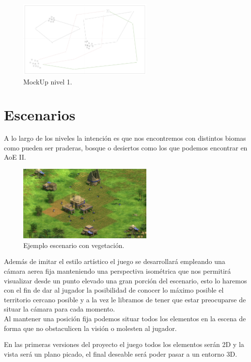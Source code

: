 \begin{figure}[ht]
\centering
\includegraphics[width=0.6\textwidth]{imagenes/gdd/nivel1.png}
\caption{MockUp nivel 1.}
\label{esq:lvl1}
\end{figure}

\section{Escenarios}
A lo largo de los niveles la intención es que nos encontremos con distintos biomas como
pueden ser praderas, bosque o desiertos como los que podemos encontrar en \ac{AoE} II.

\begin{figure}[ht]
\centering
\includegraphics[width=0.6\textwidth]{imagenes/gdd/mapa_aoe_1.jpg}
\caption{Ejemplo escenario con vegetación.}
\label{img:mapa_aoe1}
\end{figure}

Además de imitar el estilo artístico el juego se desarrollará empleando una cámara
aerea fija manteniendo una perspectiva isométrica que nos permitirá visualizar desde
un punto elevado una gran porción del escenario, esto lo haremos con el fin de dar al
jugador la posibilidad de conocer lo máximo posible el territorio cercano posible y a la
vez le libramos de tener que estar preocuparse de situar la cámara para cada momento. \\
Al mantener una posición fija podemos situar todos los elementos en la escena de forma
que no obstaculicen la visión o molesten al jugador.

En las primeras versiones del proyecto el juego todos los elementos serán 2D y la vista será
un plano picado, el final deseable será poder pasar a un entorno 3D.

